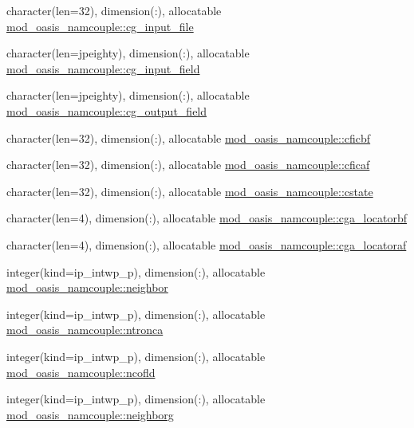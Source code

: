 \begin{DoxyCompactItemize}
\item 
character(len=32), dimension(\+:), allocatable \hyperlink{namespacemod__oasis__namcouple_a24f56cf88d79190f229d3fd1d62d17de}{mod\+\_\+oasis\+\_\+namcouple\+::cg\+\_\+input\+\_\+file}
\item 
character(len=jpeighty), dimension(\+:), allocatable \hyperlink{namespacemod__oasis__namcouple_aad4d4857b4c424e1b0f0bcc0a01aa6e3}{mod\+\_\+oasis\+\_\+namcouple\+::cg\+\_\+input\+\_\+field}
\item 
character(len=jpeighty), dimension(\+:), allocatable \hyperlink{namespacemod__oasis__namcouple_a1b680bf476776f3db085dc1f0009736c}{mod\+\_\+oasis\+\_\+namcouple\+::cg\+\_\+output\+\_\+field}
\item 
character(len=32), dimension(\+:), allocatable \hyperlink{namespacemod__oasis__namcouple_a0369f18e13cd2c3e4f9262499f967a6e}{mod\+\_\+oasis\+\_\+namcouple\+::cficbf}
\item 
character(len=32), dimension(\+:), allocatable \hyperlink{namespacemod__oasis__namcouple_a96bcbb80ff33c392d9dbb8d601878c95}{mod\+\_\+oasis\+\_\+namcouple\+::cficaf}
\item 
character(len=32), dimension(\+:), allocatable \hyperlink{namespacemod__oasis__namcouple_ac44c9e1c2c944879f81252fc1850ee19}{mod\+\_\+oasis\+\_\+namcouple\+::cstate}
\item 
character(len=4), dimension(\+:), allocatable \hyperlink{namespacemod__oasis__namcouple_ac22155599e9b49d57514dd1f7dc9928a}{mod\+\_\+oasis\+\_\+namcouple\+::cga\+\_\+locatorbf}
\item 
character(len=4), dimension(\+:), allocatable \hyperlink{namespacemod__oasis__namcouple_a6f4080d45f0b9be5a0466967f535b83b}{mod\+\_\+oasis\+\_\+namcouple\+::cga\+\_\+locatoraf}
\item 
integer(kind=ip\+\_\+intwp\+\_\+p), dimension(\+:), allocatable \hyperlink{namespacemod__oasis__namcouple_a298c9165785ae1a41f89597cadd211e7}{mod\+\_\+oasis\+\_\+namcouple\+::neighbor}
\item 
integer(kind=ip\+\_\+intwp\+\_\+p), dimension(\+:), allocatable \hyperlink{namespacemod__oasis__namcouple_aaf9fd5eaa5d115f2548b8f78cdcd172d}{mod\+\_\+oasis\+\_\+namcouple\+::ntronca}
\item 
integer(kind=ip\+\_\+intwp\+\_\+p), dimension(\+:), allocatable \hyperlink{namespacemod__oasis__namcouple_a9f8a2a4f44b1c56860fef8df014339d3}{mod\+\_\+oasis\+\_\+namcouple\+::ncofld}
\item 
integer(kind=ip\+\_\+intwp\+\_\+p), dimension(\+:), allocatable \hyperlink{namespacemod__oasis__namcouple_a883d88938c50264711c53af2b555c3db}{mod\+\_\+oasis\+\_\+namcouple\+::neighborg}

\end{DoxyCompactItemize}
